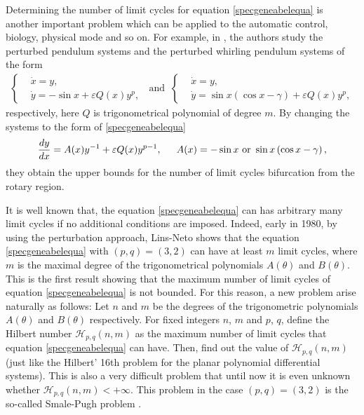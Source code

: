 \documentclass[11pt]{amsart}
\theoremstyle{remark}
\theoremstyle{definition}
\begin{document}
Determining the number of limit cycles    for equation \eqref{specgeneabelequa}   is another   important  problem which   can be applied to the automatic control, biology, physical mode and so on.
For  example, in     \cite{GGM2016,GGM2020},   the authors   study the perturbed pendulum systems and the perturbed whirling pendulum systems of the form \begin{align*}
\left\{
\begin{aligned}
&\dot{x}=y    ,  \\
&\dot{y}=-\sin x+\varepsilon Q(x)y^{p} ,
\end{aligned}
\right.\
\text{  and  }\
\left\{
\begin{aligned}
&\dot{x}=y ,    \\
&\dot{y}=\sin x\left(\cos x-\gamma\right)+\varepsilon Q(x)y^{p},
\end{aligned}
\right.
\end{align*}
respectively, here  $ Q$ is trigonometrical polynomial of degree $m$. By changing the systems to the form of \eqref{specgeneabelequa}
\begin{equation*}
\frac{dy}{dx}=A(x)y^{-1}+\varepsilon Q(x)y^{p-1},\indent A(x)=-\sin x \text{ or } \sin x\left(\cos x-\gamma\right),
\end{equation*}
they obtain   the upper bounds for the number of limit cycles bifurcation from the rotary region.


It is well known that, the equation \eqref{specgeneabelequa} can has arbitrary many limit cycles if  no additional conditions are imposed.  Indeed,    early in 1980, by using the perturbation approach,  Lins-Neto \cite{Neto1980}  shows that the  equation \eqref{specgeneabelequa} with $(p,q)=(3,2)$
 can have at least $m$ limit cycles, where $m$ is the maximal degree of the trigonometrical polynomials $A(\theta)$
and $B(\theta)$. This is the first result showing that the  maximum number of limit cycles of  equation \eqref{specgeneabelequa} is not bounded.
For this reason, a new problem arise naturally as follows:  Let $n$ and $m$ be the degrees of the  trigonometric polynomials $A(\theta) $  and $B(\theta) $ respectively. For fixed  integers $n$, $m$ and $p$, $q$, define the Hilbert number
$\mathcal H_{p,q}(n,m)$ as the maximum number  of limit cycles that equation \eqref{specgeneabelequa} can have. Then, find out the value of  $\mathcal H_{p,q}(n,m)$ (just like the Hilbert' 16th problem for the planar polynomial  differential systems).  This is   also a very difficult  problem  that
 until now it is even unknown whether  $\mathcal H_{p,q}(n,m)<+\infty$.
 This problem in the case $(p,q)=(3,2)$ is the so-called Smale-Pugh problem \cite{Smale1998}.
\end{document}
